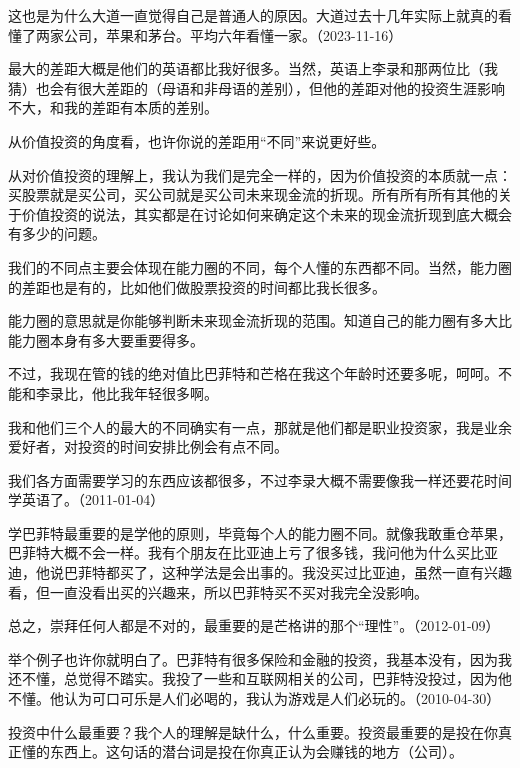 
这也是为什么大道一直觉得自己是普通人的原因。大道过去十几年实际上就真的看懂了两家公司，苹果和茅台。平均六年看懂一家。（2023-11-16）


最大的差距大概是他们的英语都比我好很多。当然，英语上李录和那两位比（我猜）也会有很大差距的（母语和非母语的差别），但他的差距对他的投资生涯影响不大，和我的差距有本质的差别。

从价值投资的角度看，也许你说的差距用“不同”来说更好些。

从对价值投资的理解上，我认为我们是完全一样的，因为价值投资的本质就一点：买股票就是买公司，买公司就是买公司未来现金流的折现。所有所有所有其他的关于价值投资的说法，其实都是在讨论如何来确定这个未来的现金流折现到底大概会有多少的问题。

我们的不同点主要会体现在能力圈的不同，每个人懂的东西都不同。当然，能力圈的差距也是有的，比如他们做股票投资的时间都比我长很多。

能力圈的意思就是你能够判断未来现金流折现的范围。知道自己的能力圈有多大比能力圈本身有多大要重要得多。

不过，我现在管的钱的绝对值比巴菲特和芒格在我这个年龄时还要多呢，呵呵。不能和李录比，他比我年轻很多啊。

我和他们三个人的最大的不同确实有一点，那就是他们都是职业投资家，我是业余爱好者，对投资的时间安排比例会有点不同。

我们各方面需要学习的东西应该都很多，不过李录大概不需要像我一样还要花时间学英语了。（2011-01-04）

学巴菲特最重要的是学他的原则，毕竟每个人的能力圈不同。就像我敢重仓苹果，巴菲特大概不会一样。我有个朋友在比亚迪上亏了很多钱，我问他为什么买比亚迪，他说巴菲特都买了，这种学法是会出事的。我没买过比亚迪，虽然一直有兴趣看，但一直没看出买的兴趣来，所以巴菲特买不买对我完全没影响。

总之，崇拜任何人都是不对的，最重要的是芒格讲的那个“理性”。（2012-01-09）

举个例子也许你就明白了。巴菲特有很多保险和金融的投资，我基本没有，因为我还不懂，总觉得不踏实。我投了一些和互联网相关的公司，巴菲特没投过，因为他不懂。他认为可口可乐是人们必喝的，我认为游戏是人们必玩的。（2010-04-30）

投资中什么最重要？我个人的理解是缺什么，什么重要。投资最重要的是投在你真正懂的东西上。这句话的潜台词是投在你真正认为会赚钱的地方（公司）。

